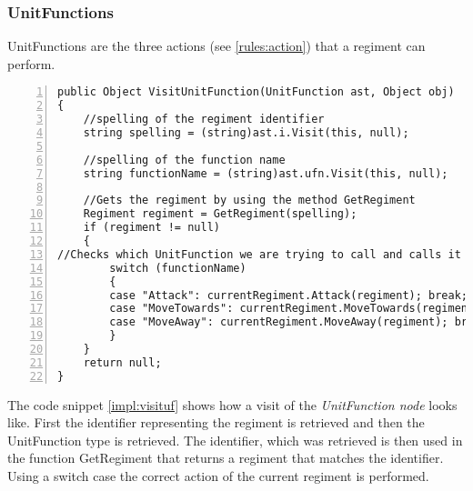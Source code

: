 	\subsubsection{UnitFunctions}
		UnitFunctions are the three actions (see \ref{rules:action}) that a regiment can perform.
		\begin{lstlisting}[basicstyle=\small\sffamily,
			keywords={break,case,const,continue,default,else,enum,
			for,if,return,switch,while,do,long,void,int,float,double,
			char,struct,typedef,include,size\_t},
			keywordstyle={\color{blue}},
			comment={[l]{//}}, morecomment={[s]{/*}{*/}}, commentstyle=\itshape,
			columns={[l]flexible}, numbers=left, numberstyle=\tiny,
			frameround=fftt, frame=shadowbox, captionpos=b,
			caption={VisitUnitFunction from the class },
			label=impl:visituf]	
public Object VisitUnitFunction(UnitFunction ast, Object obj)
{
	//spelling of the regiment identifier
	string spelling = (string)ast.i.Visit(this, null);
	
	//spelling of the function name
	string functionName = (string)ast.ufn.Visit(this, null);
	
	//Gets the regiment by using the method GetRegiment
	Regiment regiment = GetRegiment(spelling);
	if (regiment != null)
	{
//Checks which UnitFunction we are trying to call and calls it from the regiment class
		switch (functionName)
		{
		case "Attack": currentRegiment.Attack(regiment); break;
		case "MoveTowards": currentRegiment.MoveTowards(regiment); break;
		case "MoveAway": currentRegiment.MoveAway(regiment); break;
		}
	}
	return null;
}		\end{lstlisting}
		The code snippet \ref{impl:visituf} shows how a visit of the {\it UnitFunction node} looks like. 
		First the identifier representing the regiment is retrieved and then the UnitFunction type is retrieved.
		The identifier, which was retrieved is then used in the function GetRegiment that returns a regiment that matches the identifier.
		Using a switch case the correct action of the current regiment is performed.
		
